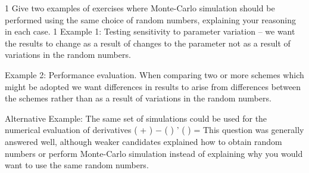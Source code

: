 
1 Give two examples of exercises where Monte-Carlo simulation should be performed
using the same choice of random numbers, explaining your reasoning in each case. 
1
Example 1: Testing sensitivity to parameter variation – we want the results to change as a result of changes to the parameter not as a result of variations in the random
numbers.

Example 2: Performance evaluation. When comparing two or more schemes which might be adopted we want differences in results to arise from differences between the
schemes rather than as a result of variations in the random numbers.

Alternative Example: The same set of simulations could be used for the numerical evaluation of derivatives
\theta  ( \alpha  + \delta  ) − \theta  ( \alpha  )
\theta  ' ( \alpha  ) =
\delta 
This question was generally answered well, although weaker candidates explained how to obtain random numbers or perform Monte-Carlo simulation instead of
explaining why you would want to use the same random numbers.



